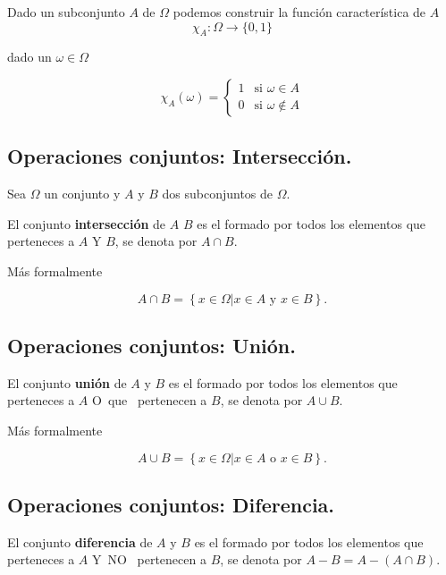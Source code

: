 \documentclass[]{book}
\begin{document}
Dado un subconjunto \(A\) de \(\Omega\) podemos construir la función característica de \(A\)
\[\chi_A:\Omega \to \{0,1\}\]

dado un \(\omega\in \Omega\)

\[
\chi_A(\omega)=
\left\{
\begin{array}{ll}
1 &  \mbox{si }\omega \in A\\
0 &  \mbox{si }\omega \not\in A
\end{array}
\right.
\]

\hypertarget{operaciones-conjuntos-intersecciuxf3n.}{%
\subsection{Operaciones conjuntos: Intersección.}\label{operaciones-conjuntos-intersecciuxf3n.}}

Sea \(\Omega\) un conjunto y \(A\) y \(B\) dos subconjuntos de \(\Omega\).

El conjunto \textbf{intersección} de \(A\) \(B\) es el formado por todos los elementos que perteneces a \(A\) \mbox{Y} \(B\), se denota por \(A\cap B\).

Más formalmente

\[
A\cap B=\left\{x\in\Omega \big| x\in A \mbox{ y } x\in B\right\}.
\]

\hypertarget{operaciones-conjuntos-uniuxf3n.}{%
\subsection{Operaciones conjuntos: Unión.}\label{operaciones-conjuntos-uniuxf3n.}}

El conjunto \textbf{unión} de \(A\) y \(B\) es el formado por todos los elementos que perteneces a \(A\) \mbox{O que } pertenecen a \(B\), se denota por \(A\cup B\).

Más formalmente

\[
A\cup B=\left\{x\in\Omega \big| x\in A \mbox{ o } x\in B\right\}.
\]

\hypertarget{operaciones-conjuntos-diferencia.}{%
\subsection{Operaciones conjuntos: Diferencia.}\label{operaciones-conjuntos-diferencia.}}

El conjunto \textbf{diferencia} de \(A\) y \(B\) es el formado por todos los elementos que perteneces a \(A\) \mbox{Y NO } pertenecen a \(B\), se denota por \(A-B=A-(A\cap B)\).
\end{document}
